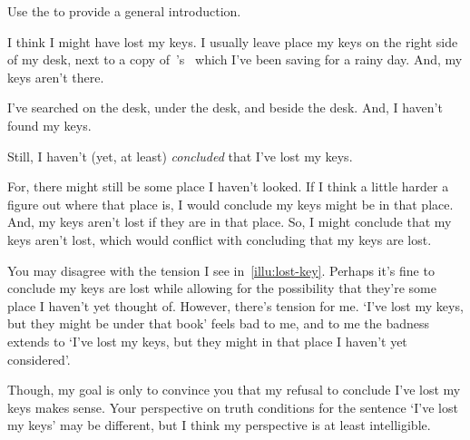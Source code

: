 \begin{note}
  Use the \illu{} to provide a general introduction.
\end{note}

\begin{note}
  \begin{scenario}
    \label{illu:lost-key}
    I think I might have lost my keys.
    I usually leave place my keys on the right side of my desk, next to a copy of~\citeauthor{Vickers:1989tr}'s~ which I've been saving for a rainy day.
    And, my keys aren't there.

    I've searched on the desk, under the desk, and beside the desk.
    And, I haven't found my keys.

    Still, I haven't (yet, at least) \emph{concluded} that I've lost my keys.

    For, there might still be some place I haven't looked.
    If I think a little harder a figure out where that place is, I would conclude my keys might be in that place.
    And, my keys aren't lost if they are in that place.
    So, I might conclude that my keys aren't lost, which would conflict with concluding that my keys are lost.
  \end{scenario}

  You may disagree with the tension I see in~\autoref{illu:lost-key}.
  Perhaps it's fine to conclude my keys are lost while allowing for the possibility that they're some place I haven't yet thought of.
  However, there's tension for me.
  `I've lost my keys, but they might be under that book' feels bad to me, and to me the badness extends to `I've lost my keys, but they might in that place I haven't yet considered'.

  Though, my goal is only to convince you that my refusal to conclude I've lost my keys makes sense.
  Your perspective on truth conditions for the sentence `I've lost my keys' may be different, but I think my perspective is at least intelligible.
\end{note}

